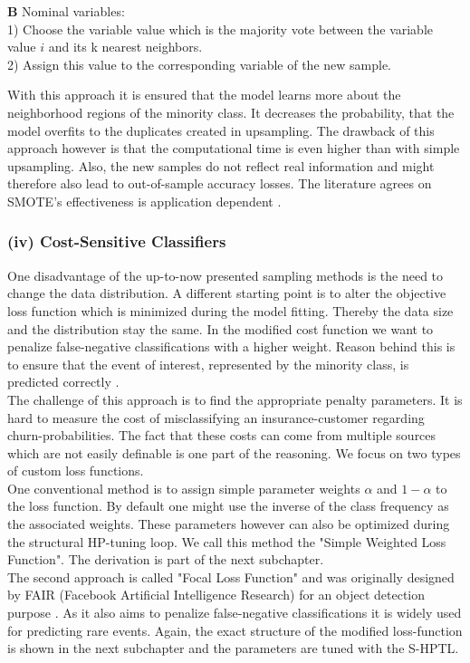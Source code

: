 \documentclass[12pt,titlepage]{article}
\begin{document}
\textbf{B} Nominal variables: \\
1) Choose the variable value which is the majority vote between the variable value $i$ and its k nearest neighbors. \\
2) Assign this value to the corresponding variable of the new sample.
\vspace{6mm}

\noindent
With this approach it is ensured that the model learns more about the neighborhood regions of the minority class. It decreases the probability, that the model overfits to the duplicates created in upsampling. The drawback of this approach however is that the computational time is even higher than with simple upsampling. Also, the new samples do not reflect real information and might therefore also lead to out-of-sample accuracy losses. The literature agrees on SMOTE's effectiveness is application dependent \cite{mining_rarity}. \\

\subsubsection*{(iv) Cost-Sensitive Classifiers} \label{Cost-Sensitive Classifiers}
One disadvantage of the up-to-now presented sampling methods is the need to change the data distribution. A different starting point is to alter the objective loss function which is minimized during the model fitting. Thereby the data size and the distribution stay the same. In the modified cost function we want to penalize false-negative
classifications with a higher weight. Reason behind this is to ensure that the event of interest, represented by the minority class, is predicted correctly \cite{cost_sensitive}. \\
The challenge of this approach is to find the appropriate penalty parameters. It is hard to measure the cost of misclassifying an insurance-customer regarding churn-probabilities. The fact that these costs can come from multiple sources which are not easily definable is one part of the reasoning. We focus on two types of custom loss functions.\\
One conventional method is to assign simple parameter weights $\alpha$ and $1 - \alpha$ to the loss function. By default one might use the inverse of the class frequency as the associated weights. These parameters however can also be optimized during the structural HP-tuning loop. We call this method the "Simple Weighted Loss Function". The derivation is part of the next subchapter.\\
The second approach is called "Focal Loss Function" and was originally designed by FAIR (Facebook Artificial Intelligence Research) for an object detection purpose \cite{focal}. As it also aims to penalize false-negative classifications it is widely used for predicting rare events. Again, the exact structure of the modified loss-function is shown in the next subchapter and the parameters are tuned with the S-HPTL.
\vspace{6mm}
\end{document}
